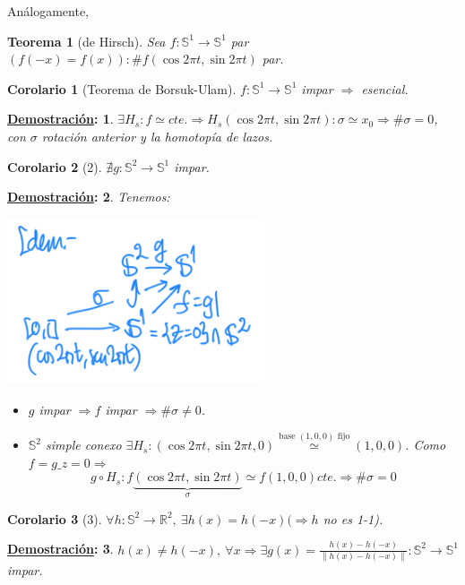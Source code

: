 \documentclass[10pt,a4paper,openright]{book}
\theoremstyle{break}
\newtheorem*{theo}{Teorema}
\newtheorem*{coro}{Corolario}
\newtheorem*{demo}{\underline{Demostración}:}
\begin{document}
Análogamente, 
\begin{theo}[de Hirsch]
Sea $f: \mathbb{S}^{1} \rightarrow \mathbb{S}^{1}$ par $\left( f\left( -x \right) = f\left( x \right) \right): \# f\left( \cos 2 \pi t, \sin 2 \pi t \right)$ par. 
\end{theo}
\begin{coro}[Teorema de Borsuk-Ulam]
$f: \mathbb{S}^{1} \rightarrow \mathbb{S}^{1}$ impar $\Rightarrow$ esencial.
\end{coro}
\begin{demo}
$\exists H_s : f \simeq cte. \Rightarrow H_s\left( \cos 2 \pi t, \sin 2 \pi t \right) : \sigma \simeq x_0 \Rightarrow \# \sigma = 0$, con $\sigma$ rotación anterior y la homotopía de lazos.
\end{demo}
\begin{coro}[2]
$\nexists g: \mathbb{S}^{2} \rightarrow \mathbb{S}^{1}$ impar. 
\end{coro}
\begin{demo}
Tenemos:
\begin{center}
    \includegraphics[scale=0.3]{images/cor_2_borsuk_ulam} 
\end{center}
\begin{itemize}
    \item $g$ impar $\Rightarrow f$ impar $\Rightarrow \# \sigma \neq 0$.

    \item $\mathbb{S}^{2}$ simple conexo $\exists H_s : \left( \cos 2 \pi t, \sin 2\pi t, 0 \right) \stackrel{\text{base } \left( 1, 0, 0 \right) \text{ fijo}}{\simeq} \left( 1, 0, 0 \right)$. Como $f = g\_{z = 0} \Rightarrow$
    \[
    g \circ H_s : f\underbrace{\left( \cos 2 \pi t, \sin 2 \pi t \right)}_{\sigma} \simeq f\left( 1, 0, 0 \right) cte. \Rightarrow \# \sigma = 0
    \]
\end{itemize}
\end{demo}
\begin{coro}[3]
$\forall h: \mathbb{S}^{2} \rightarrow \mathbb{R}^{2},\ \exists h\left( x \right) = h\left( -x \right) (\Rightarrow h$ no es 1-1).  
\end{coro}
\begin{demo}
$h\left( x \right) \neq h\left( -x \right),\ \forall x \Rightarrow \exists g \left( x \right) = \frac{h\left( x \right) - h\left( -x \right)}{\lVert h\left( x \right) - h\left( -x \right) \rVert}: \mathbb{S}^{2} \rightarrow \mathbb{S}^{1}$ impar.
\end{demo}
\end{document}
